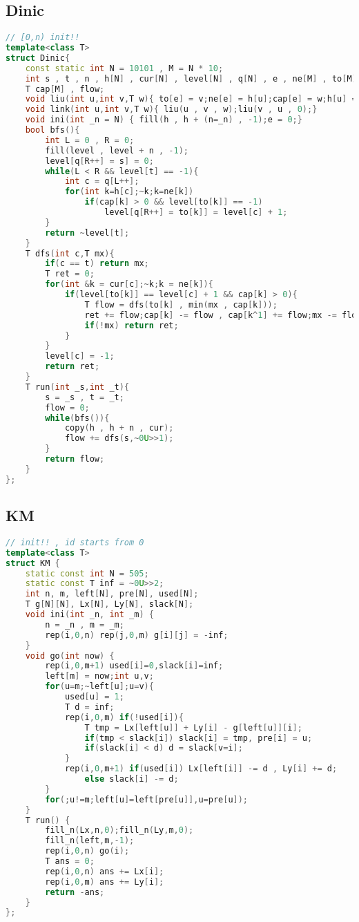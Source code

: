 \subsection{Dinic}
\begin{lstlisting}[language=C++]
// [0,n) init!!
template<class T>
struct Dinic{
    const static int N = 10101 , M = N * 10;
    int s , t , n , h[N] , cur[N] , level[N] , q[N] , e , ne[M] , to[M];
    T cap[M] , flow;
    void liu(int u,int v,T w){ to[e] = v;ne[e] = h[u];cap[e] = w;h[u] = e++;}
    void link(int u,int v,T w){ liu(u , v , w);liu(v , u , 0);}
    void ini(int _n = N) { fill(h , h + (n=_n) , -1);e = 0;}
    bool bfs(){
        int L = 0 , R = 0;
        fill(level , level + n , -1);
        level[q[R++] = s] = 0;
        while(L < R && level[t] == -1){
            int c = q[L++];
            for(int k=h[c];~k;k=ne[k])
                if(cap[k] > 0 && level[to[k]] == -1)
                    level[q[R++] = to[k]] = level[c] + 1;
        }
        return ~level[t];
    }
    T dfs(int c,T mx){
        if(c == t) return mx;
        T ret = 0;
        for(int &k = cur[c];~k;k = ne[k]){
            if(level[to[k]] == level[c] + 1 && cap[k] > 0){
                T flow = dfs(to[k] , min(mx , cap[k]));
                ret += flow;cap[k] -= flow , cap[k^1] += flow;mx -= flow;
                if(!mx) return ret;
            }
        }
        level[c] = -1;
        return ret;
    }
    T run(int _s,int _t){
        s = _s , t = _t;
        flow = 0;
        while(bfs()){
            copy(h , h + n , cur);
            flow += dfs(s,~0U>>1);
        }
        return flow;
    }
};
\end{lstlisting}
\subsection{KM}
\begin{lstlisting}[language=C++]
// init!! , id starts from 0
template<class T>
struct KM {
    static const int N = 505;
    static const T inf = ~0U>>2;
    int n, m, left[N], pre[N], used[N];
    T g[N][N], Lx[N], Ly[N], slack[N];
    void ini(int _n, int _m) {
        n = _n , m = _m;
        rep(i,0,n) rep(j,0,m) g[i][j] = -inf;
    }
    void go(int now) {
        rep(i,0,m+1) used[i]=0,slack[i]=inf;
        left[m] = now;int u,v;
        for(u=m;~left[u];u=v){
            used[u] = 1;
            T d = inf;
            rep(i,0,m) if(!used[i]){
                T tmp = Lx[left[u]] + Ly[i] - g[left[u]][i];
                if(tmp < slack[i]) slack[i] = tmp, pre[i] = u;
                if(slack[i] < d) d = slack[v=i];
            }
            rep(i,0,m+1) if(used[i]) Lx[left[i]] -= d , Ly[i] += d;
                else slack[i] -= d;
        }
        for(;u!=m;left[u]=left[pre[u]],u=pre[u]);
    }
    T run() {
        fill_n(Lx,n,0);fill_n(Ly,m,0);
        fill_n(left,m,-1);
        rep(i,0,n) go(i);
        T ans = 0;
        rep(i,0,n) ans += Lx[i];
        rep(i,0,m) ans += Ly[i];
        return -ans;
    }
};
\end{lstlisting}
